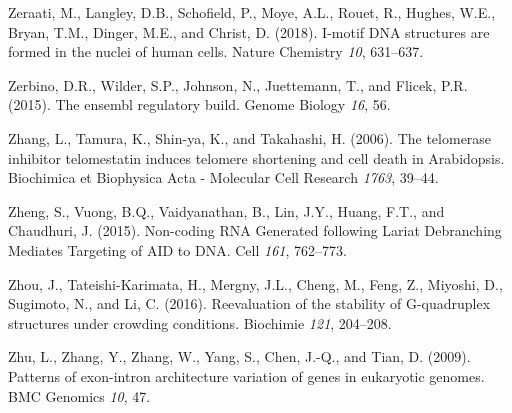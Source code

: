 \documentclass[12pt,a4paper,]{report}
\begin{document}
\leavevmode\hypertarget{ref-Zeraati2018}{}%
Zeraati, M., Langley, D.B., Schofield, P., Moye, A.L., Rouet, R.,
Hughes, W.E., Bryan, T.M., Dinger, M.E., and Christ, D. (2018). I-motif
DNA structures are formed in the nuclei of human cells. Nature Chemistry
\emph{10}, 631--637.

\leavevmode\hypertarget{ref-Zerbino2015}{}%
Zerbino, D.R., Wilder, S.P., Johnson, N., Juettemann, T., and Flicek,
P.R. (2015). The ensembl regulatory build. Genome Biology \emph{16}, 56.

\leavevmode\hypertarget{ref-Zhang2006}{}%
Zhang, L., Tamura, K., Shin-ya, K., and Takahashi, H. (2006). The
telomerase inhibitor telomestatin induces telomere shortening and cell
death in Arabidopsis. Biochimica et Biophysica Acta - Molecular Cell
Research \emph{1763}, 39--44.

\leavevmode\hypertarget{ref-Zheng2015}{}%
Zheng, S., Vuong, B.Q., Vaidyanathan, B., Lin, J.Y., Huang, F.T., and
Chaudhuri, J. (2015). Non-coding RNA Generated following Lariat
Debranching Mediates Targeting of AID to DNA. Cell \emph{161}, 762--773.

\leavevmode\hypertarget{ref-Zhou2016}{}%
Zhou, J., Tateishi-Karimata, H., Mergny, J.L., Cheng, M., Feng, Z.,
Miyoshi, D., Sugimoto, N., and Li, C. (2016). Reevaluation of the
stability of G-quadruplex structures under crowding conditions.
Biochimie \emph{121}, 204--208.

\leavevmode\hypertarget{ref-Zhu2009}{}%
Zhu, L., Zhang, Y., Zhang, W., Yang, S., Chen, J.-Q., and Tian, D.
(2009). Patterns of exon-intron architecture variation of genes in
eukaryotic genomes. BMC Genomics \emph{10}, 47.
\end{document}
